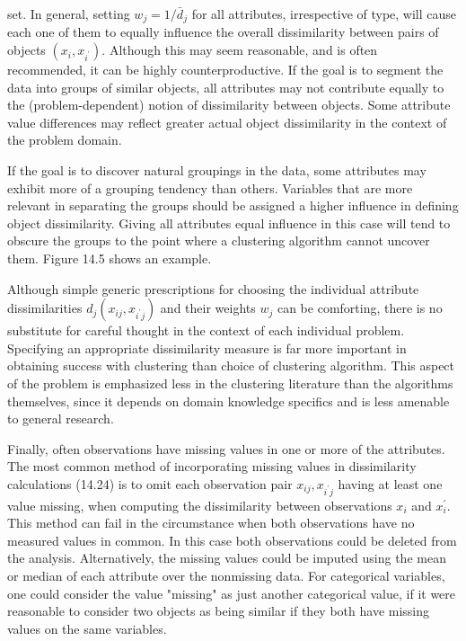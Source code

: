 \documentclass[10pt]{article}
\begin{document}
set. In general, setting $w_{j}=1 / \bar{d}_{j}$ for all attributes, irrespective of type, will cause each one of them to equally influence the overall dissimilarity between pairs of objects $\left(x_{i}, x_{i^{\prime}}\right)$. Although this may seem reasonable, and is often recommended, it can be highly counterproductive. If the goal is to segment the data into groups of similar objects, all attributes may not contribute equally to the (problem-dependent) notion of dissimilarity between objects. Some attribute value differences may reflect greater actual object dissimilarity in the context of the problem domain.

If the goal is to discover natural groupings in the data, some attributes may exhibit more of a grouping tendency than others. Variables that are more relevant in separating the groups should be assigned a higher influence in defining object dissimilarity. Giving all attributes equal influence in this case will tend to obscure the groups to the point where a clustering algorithm cannot uncover them. Figure 14.5 shows an example.

Although simple generic prescriptions for choosing the individual attribute dissimilarities $d_{j}\left(x_{i j}, x_{i^{\prime} j}\right)$ and their weights $w_{j}$ can be comforting, there is no substitute for careful thought in the context of each individual problem. Specifying an appropriate dissimilarity measure is far more important in obtaining success with clustering than choice of clustering algorithm. This aspect of the problem is emphasized less in the clustering literature than the algorithms themselves, since it depends on domain knowledge specifics and is less amenable to general research.

Finally, often observations have missing values in one or more of the attributes. The most common method of incorporating missing values in dissimilarity calculations (14.24) is to omit each observation pair $x_{i j}, x_{i^{\prime} j}$ having at least one value missing, when computing the dissimilarity between observations $x_{i}$ and $x_{i}^{\prime}$. This method can fail in the circumstance when both observations have no measured values in common. In this case both observations could be deleted from the analysis. Alternatively, the missing values could be imputed using the mean or median of each attribute over the nonmissing data. For categorical variables, one could consider the value "missing" as just another categorical value, if it were reasonable to consider two objects as being similar if they both have missing values on the same variables.
\end{document}
